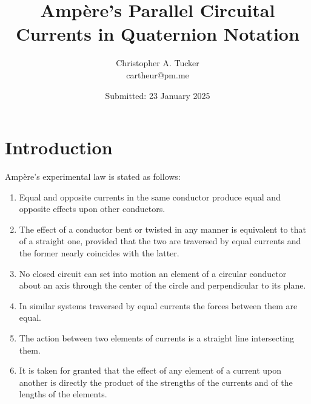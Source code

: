 \documentclass[]{article}
\begin{document}
\title{Amp\`ere's Parallel Circuital Currents in Quaternion Notation}

\author{Christopher A. Tucker\\cartheur@pm.me\\}

\date{Submitted: 23 January 2025}

\maketitle


\section{Introduction}
Amp\`ere's experimental law is stated as follows:

\begin{enumerate}
  \item Equal and opposite currents in the same conductor produce equal and opposite effects upon other conductors.
  \item The effect of a conductor bent or twisted in any manner is equivalent to that of a straight one, provided that the two are traversed by equal currents and the former nearly coincides with the latter.
  \item No closed circuit can set into motion an element of a circular conductor about an axis through the center of the circle and perpendicular to its plane.
  \item In similar systems traversed by equal currents the forces between them are equal.
  \item The action between two elements of currents is a straight line intersecting them.
  \item It is taken for granted that the effect of any element of a current upon another is directly the product of the strengths of the currents and of the lengths of the elements.
\end{enumerate}
\end{document}
